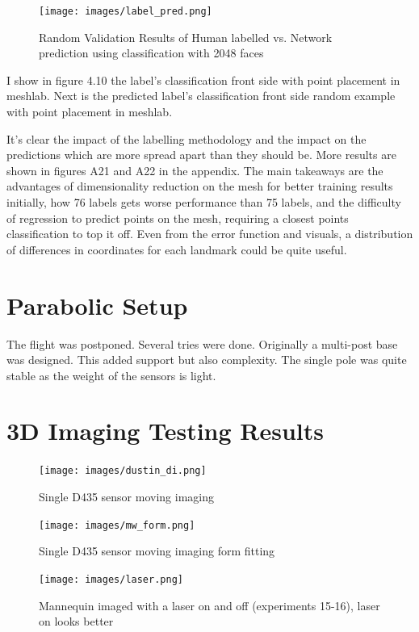 \begin{figure}[!htb]
	\caption{Random Validation Results of Human labelled vs. Network prediction using classification with 2048 faces}
	\centering
	\texttt{[image: images/label\_pred.png]}
\end{figure}

I show in figure 4.10 the label's classification front side with point placement in meshlab. Next is the predicted label's classification front side random example with point placement in meshlab.

It's clear the impact of the labelling methodology and the impact on the predictions which are more spread apart than they should be. More results are shown in figures A21 and A22 in the appendix. The main takeaways are the advantages of dimensionality reduction on the mesh for better training results initially, how 76 labels gets worse performance than 75 labels, and the difficulty of regression to predict points on the mesh, requiring a closest points classification to top it off. Even from the error function and visuals, a distribution of differences in coordinates for each landmark could be quite useful.

\section{Parabolic Setup}
The flight was postponed. Several tries were done. Originally a multi-post base was designed. This added support but also complexity. The single pole was quite stable as the weight of the sensors is light.
\section{3D Imaging Testing Results}

\begin{figure}[!htb]
	\caption{Single D435 sensor moving imaging}
	\centering
	\texttt{[image: images/dustin\_di.png]}
\end{figure}

\begin{figure}[!htb]
	\caption{Single D435 sensor moving imaging form fitting}
	\centering
	\texttt{[image: images/mw\_form.png]}
\end{figure}


\begin{figure}[!htb]
	\caption{Mannequin imaged with a laser on and off (experiments 15-16), laser on looks better}
	\centering
	\texttt{[image: images/laser.png]}
\end{figure}


